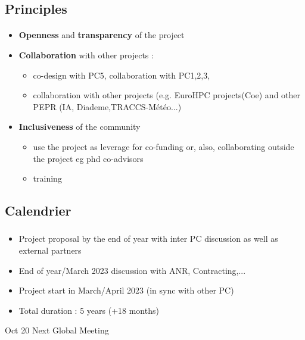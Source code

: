 \subsection{Principles}
\begin{frame}[fragile=singleslide]{\insertsectionhead}
  \framesubtitle{\insertsubsectionhead}

  \begin{itemize}
    \item \textbf{Openness} and \textbf{transparency} of the project 
    \item \textbf{Collaboration} with other projects : 
    \begin{itemize}
      \item 
        co-design with PC5, collaboration with PC1,2,3,\
        \item 
          collaboration with other projects (e.g. EuroHPC projects(Coe) and other PEPR (IA, Diademe,TRACCS-Météo...)
    \end{itemize}
    \item \textbf{Inclusiveness} of the community 
    \begin{itemize}
      \item use the project as leverage for co-funding  or, also, collaborating outside the project eg phd co-advisors
      \item training
    \end{itemize}      
  \end{itemize}

\end{frame}

\subsection{Calendrier}
\begin{frame}
  \frametitle{\insertsectionhead}

  \begin{itemize}
    \item Project proposal by the end of year with inter PC discussion as well as external partners
    \item End of year/March 2023 discussion with ANR, Contracting,...
    \item Project start in March/April 2023 (in sync with other PC)
    \item Total duration : 5 years (+18 months)
  \end{itemize}

  \begin{alertblock}{Oct 20}
    Next Global Meeting 
  \end{alertblock}
\end{frame}

